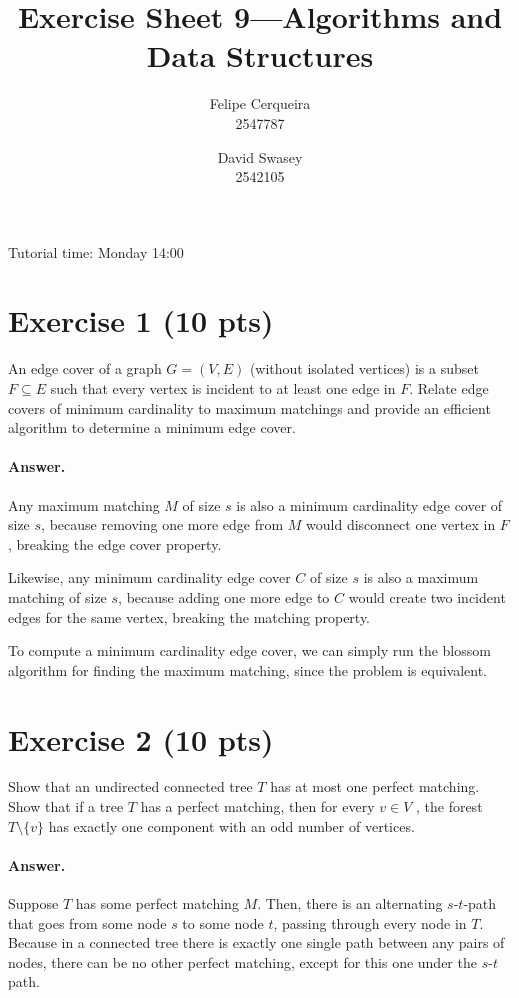 \documentclass[a4paper]{article}
\title{Exercise Sheet 9---Algorithms and Data Structures}
\author{Felipe Cerqueira \\ 2547787 \and David Swasey \\ 2542105}
\begin{document}
\maketitle

Tutorial time: Monday 14:00

\section*{Exercise 1 (10 pts)}

An edge cover of a graph $G = (V, E)$ (without isolated vertices) is a subset $F \subseteq E$ such that every vertex is incident to at least one edge in $F$. Relate edge covers of minimum cardinality to maximum matchings and provide an efficient algorithm to determine a minimum edge cover.

\paragraph{Answer.}

Any maximum matching $M$ of size $s$ is also a minimum cardinality edge cover of size $s$, because removing one more edge from $M$ would disconnect one vertex in $F$, breaking the edge cover property.

Likewise, any minimum cardinality edge cover $C$ of size $s$ is also a maximum matching of size $s$, because adding one more edge to $C$ would create two incident edges for the same vertex, breaking the matching property.

To compute a minimum cardinality edge cover, we can simply run the blossom algorithm for finding the maximum matching, since the problem is equivalent.

\section*{Exercise 2 (10 pts)}

Show that an undirected connected tree $T$ has at most one perfect matching. Show that if a tree $T$ has a perfect matching, then for every $v \in V$ , the forest $T \setminus \{v\}$ has exactly one component with an odd number of vertices.

\paragraph{Answer.}

Suppose $T$ has some perfect matching $M$. Then, there is an alternating $s$-$t$-path that goes from some node $s$ to some node $t$, passing through every node in $T$. Because in a connected tree there is exactly one single path between any pairs of nodes, there can be no other perfect matching, except for this one under the $s$-$t$ path.
\end{document}
